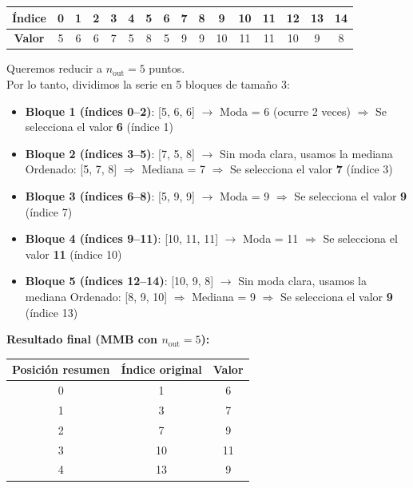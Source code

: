 \begin{center}
\begin{tabular}{|c|c|c|c|c|c|c|c|c|c|c|c|c|c|c|c|}
\hline
\textbf{Índice} & 0 & 1 & 2 & 3 & 4 & 5 & 6 & 7 & 8 & 9 & 10 & 11 & 12 & 13 & 14 \\
\hline
\textbf{Valor} & 5 & 6 & 6 & 7 & 5 & 8 & 5 & 9 & 9 & 10 & 11 & 11 & 10 & 9 & 8 \\
\hline
\end{tabular}
\end{center}


Queremos reducir a $n_{\text{out}} = 5$ puntos. \\Por lo tanto, dividimos la serie en 5 bloques de tamaño 3:

\begin{itemize}
    \item \textbf{Bloque 1 (índices 0--2)}: [5, 6, 6]  
    $\rightarrow$ Moda = 6 (ocurre 2 veces)  
    $\Rightarrow$ Se selecciona el valor \textbf{6} (índice 1)
    
    \item \textbf{Bloque 2 (índices 3--5)}: [7, 5, 8]  
    $\rightarrow$ Sin moda clara, usamos la mediana  
    Ordenado: [5, 7, 8] $\Rightarrow$ Mediana = 7  
    $\Rightarrow$ Se selecciona el valor \textbf{7} (índice 3)
    
    \item \textbf{Bloque 3 (índices 6--8)}: [5, 9, 9]  
    $\rightarrow$ Moda = 9  
    $\Rightarrow$ Se selecciona el valor \textbf{9} (índice 7)
    
    \item \textbf{Bloque 4 (índices 9--11)}: [10, 11, 11]  
    $\rightarrow$ Moda = 11  
    $\Rightarrow$ Se selecciona el valor \textbf{11} (índice 10)
    
    \item \textbf{Bloque 5 (índices 12--14)}: [10, 9, 8]  
    $\rightarrow$ Sin moda clara, usamos la mediana  
    Ordenado: [8, 9, 10] $\Rightarrow$ Mediana = 9  
    $\Rightarrow$ Se selecciona el valor \textbf{9} (índice 13)
\end{itemize}

\bigskip

\noindent \textbf{Resultado final (MMB con $n_{\text{out}} = 5$):}

\begin{center}
\begin{tabular}{|c|c|c|}
\hline
Posición resumen & Índice original & Valor \\
\hline
0 & 1 & 6 \\
1 & 3 & 7 \\
2 & 7 & 9 \\
3 & 10 & 11 \\
4 & 13 & 9 \\
\hline
\end{tabular}
\end{center}

